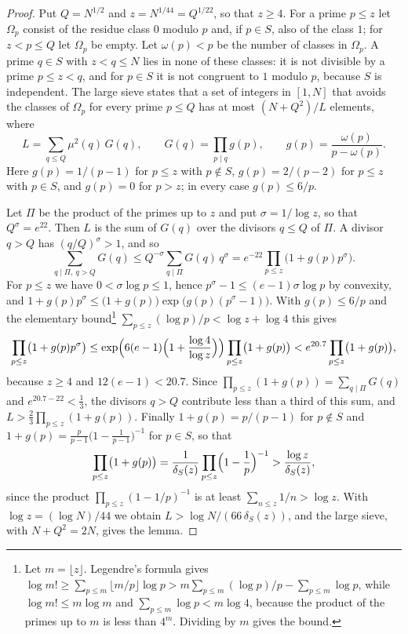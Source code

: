 \documentclass[11pt,reqno]{amsart}
\numberwithin{equation}{section}
\theoremstyle{plain}
\theoremstyle{definition}
\theoremstyle{remark}
\begin{document}
\begin{proof}
Put $Q=N^{1/2}$ and $z=N^{1/44}=Q^{1/22}$, so that $z\ge4$. For a prime
$p\le z$ let $\Omega_p$ consist of the residue class $0$ modulo $p$
and, if $p\in S$, also of the class $1$; for $z<p\le Q$ let $\Omega_p$
be empty. Let $\omega(p)<p$ be the number of classes in $\Omega_p$. A
prime $q\in S$ with $z<q\le N$ lies in none of these classes: it is
not divisible by a prime $p\le z<q$, and for $p\in S$ it is not
congruent to $1$ modulo $p$, because $S$ is independent. The large
sieve \cite{Mon68,MV73} states that a set of integers in $[1,N]$ that
avoids the classes of $\Omega_p$ for every prime $p\le Q$ has at most
$(N+Q^2)/L$ elements, where
\[
  L=\sum_{q\le Q}\mu^2(q)\,G(q),\qquad G(q)=\prod_{p\mid q}g(p),\qquad
  g(p)=\frac{\omega(p)}{p-\omega(p)} .
\]
Here $g(p)=1/(p-1)$ for $p\le z$ with $p\notin S$, $g(p)=2/(p-2)$ for
$p\le z$ with $p\in S$, and $g(p)=0$ for $p>z$; in every case
$g(p)\le6/p$.

Let $\Pi$ be the product of the primes up to $z$ and put
$\sigma=1/\log z$, so that $Q^{\sigma}=e^{22}$. Then $L$ is the sum of
$G(q)$ over the divisors $q\le Q$ of $\Pi$. A divisor $q>Q$ has
$(q/Q)^{\sigma}>1$, and so
\[
  \sum_{q\mid\Pi,\ q>Q}G(q)\le Q^{-\sigma}\sum_{q\mid\Pi}G(q)\,q^{\sigma}
  =e^{-22}\prod_{p\le z}\bigl(1+g(p)p^{\sigma}\bigr).
\]
For $p\le z$ we have $0<\sigma\log p\le1$, hence
$p^{\sigma}-1\le(e-1)\sigma\log p$ by convexity, and
$1+g(p)p^{\sigma}\le\bigl(1+g(p)\bigr)\exp\bigl(g(p)(p^{\sigma}-1)\bigr)$.
With $g(p)\le6/p$ and the elementary bound\footnote{Let
$m=\lfloor z\rfloor$. Legendre's formula gives
$\log m!\ge\sum_{p\le m}\lfloor m/p\rfloor\log p
>m\sum_{p\le m}(\log p)/p-\sum_{p\le m}\log p$, while
$\log m!\le m\log m$ and $\sum_{p\le m}\log p<m\log4$, because the
product of the primes up to $m$ is less than $4^m$. Dividing by $m$
gives the bound.}
$\sum_{p\le z}(\log p)/p<\log z+\log4$ this gives
\[
  \prod_{p\le z}\bigl(1+g(p)p^{\sigma}\bigr)
  \le\exp\Bigl(6(e-1)\Bigl(1+\frac{\log4}{\log z}\Bigr)\Bigr)
  \prod_{p\le z}\bigl(1+g(p)\bigr)
  <e^{20.7}\prod_{p\le z}\bigl(1+g(p)\bigr),
\]
because $z\ge4$ and $12(e-1)<20.7$. Since
$\prod_{p\le z}(1+g(p))=\sum_{q\mid\Pi}G(q)$ and $e^{20.7-22}<\frac13$,
the divisors $q>Q$ contribute less than a third of this sum, and
$L>\frac23\prod_{p\le z}(1+g(p))$. Finally $1+g(p)=p/(p-1)$ for
$p\notin S$ and $1+g(p)=\frac p{p-1}\bigl(1-\frac1{p-1}\bigr)^{-1}$ for
$p\in S$, so that
\[
  \prod_{p\le z}\bigl(1+g(p)\bigr)
  =\frac1{\delta_S(z)}\prod_{p\le z}\Bigl(1-\frac1p\Bigr)^{-1}
  >\frac{\log z}{\delta_S(z)},
\]
since the product $\prod_{p\le z}(1-1/p)^{-1}$ is at least
$\sum_{n\le z}1/n>\log z$. With $\log z=(\log N)/44$ we obtain
$L>\log N/(66\,\delta_S(z))$, and the large sieve, with $N+Q^2=2N$,
gives the lemma.
\end{proof}
\end{document}

